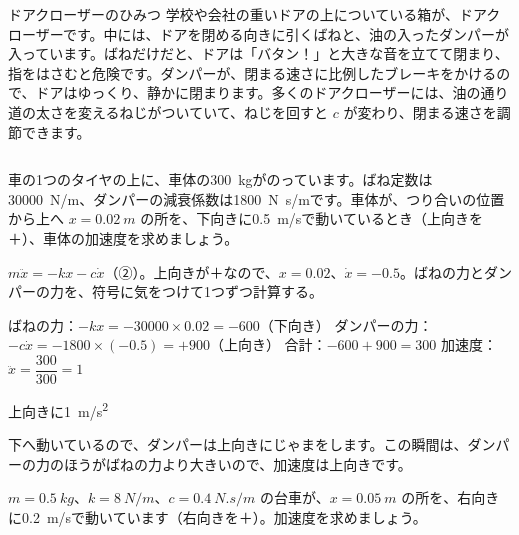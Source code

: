 {}

\begin{column}{ドアクローザーのひみつ}
学校や会社の重いドアの上についている箱が、ドアクローザーです。中には、ドアを閉める向きに引くばねと、油の入ったダンパーが入っています。ばねだけだと、ドアは「バタン！」と大きな音を立てて閉まり、指をはさむと危険です。ダンパーが、閉まる速さに比例したブレーキをかけるので、ドアはゆっくり、静かに閉まります。多くのドアクローザーには、油の通り道の太さを変えるねじがついていて、ねじを回すと $c$ が変わり、閉まる速さを調節できます。
\end{column}


\begin{reidai}
車の1つのタイヤの上に、車体の\qty{300}{kg}がのっています。ばね定数は\qty{30000}{N/m}、ダンパーの減衰係数は\qty{1800}{N.s/m}です。車体が、つり合いの位置から上へ $x=\qty{0.02}{m}$ の所を、下向きに\qty{0.5}{m/s}で動いているとき（上向きを＋）、車体の加速度を求めましょう。\par
\kangaekata $m\ddot x=-kx-c\dot x$（②）。上向きが＋なので、$x=0.02$、$\dot x=-0.5$。ばねの力とダンパーの力を、符号に気をつけて1つずつ計算する。\par
\shiki
\kviha ばねの力：$-kx=-\num{30000}\times0.02=-600$（下向き）
\kviha ダンパーの力：$-c\dot x=-1800\times(-0.5)=+900$（上向き）
\kviha 合計：$-600+900=300$
\kviha 加速度：$\ddot x=\dfrac{300}{300}=1$\par
\kotae 上向きに\qty{1}{m/s^2}
\end{reidai}
下へ動いているので、ダンパーは上向きにじゃまをします。この瞬間は、ダンパーの力のほうがばねの力より大きいので、加速度は上向きです。

\begin{jibun}
$m=\qty{0.5}{kg}$、$k=\qty{8}{N/m}$、$c=\qty{0.4}{N.s/m}$ の台車が、$x=\qty{0.05}{m}$ の所を、右向きに\qty{0.2}{m/s}で動いています（右向きを＋）。加速度を求めましょう。
\end{jibun}

